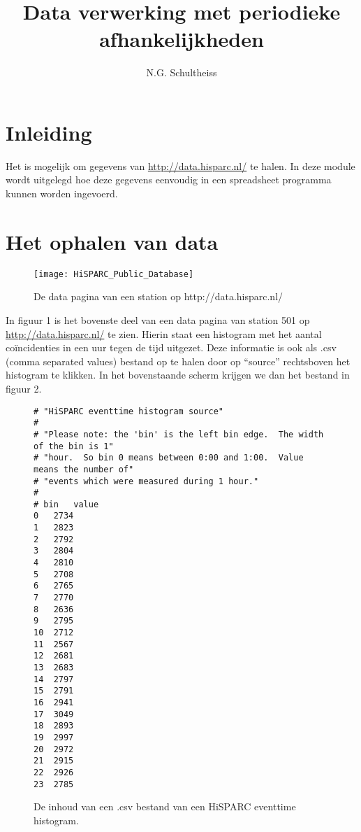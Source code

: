 



\title{Data verwerking met periodieke afhankelijkheden}
\author{N.G. Schultheiss}
\date{}

\maketitle
\thispagestyle{firststyle}

\section{Inleiding}

Het is mogelijk om gegevens van \url{http://data.hisparc.nl/} te halen. In
deze module wordt uitgelegd hoe deze gegevens eenvoudig in een spreadsheet
programma kunnen worden ingevoerd.


\section{Het ophalen van data}

\begin{figure}[h]
    \centering
    \texttt{[image: HiSPARC\_Public\_Database]}
    \caption{De data pagina van een station op http://data.hisparc.nl/}
\end{figure}


In figuur 1 is het bovenste deel van een data pagina van station 501 op
\url{http://data.hisparc.nl/} te zien. Hierin staat een histogram met het
aantal coïncidenties in een uur tegen de tijd uitgezet. Deze informatie
is ook als .csv (comma separated values) bestand op te halen door op
``source'' rechtsboven het histogram te klikken. In het bovenstaande
scherm krijgen we dan het bestand in figuur 2.

\begin{figure}[h]
\centering
\begin{verbatim}
# "HiSPARC eventtime histogram source"
#
# "Please note: the 'bin' is the left bin edge.  The width of the bin is 1"
# "hour.  So bin 0 means between 0:00 and 1:00.  Value means the number of"
# "events which were measured during 1 hour."
#
# bin	value
0	2734
1	2823
2	2792
3	2804
4	2810
5	2708
6	2765
7	2770
8	2636
9	2795
10	2712
11	2567
12	2681
13	2683
14	2797
15	2791
16	2941
17	3049
18	2893
19	2997
20	2972
21	2915
22	2926
23	2785
\end{verbatim}
\caption{De inhoud van een .csv bestand van een HiSPARC eventtime histogram.}
\label{fig:eventtime-source}
\end{figure}


